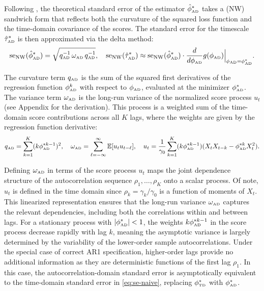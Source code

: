 \documentclass[docs/main.tex]{subfiles}
\begin{document}
Following \citet[Chapter~22.8 and Chapter~23.5]{hansen_econometrics_2022}, the theoretical standard error of the estimator $\hat{\phi}^*_{\scriptscriptstyle\text{AD}}$ takes a \citet{newey_simple_1987} (NW) sandwich form that reflects both the curvature of the squared loss function and the time-domain covariance of the scores. The standard error for the timescale $\hat{\tau}^*_{\scriptscriptstyle\text{AD}}$ is then approximated via the delta method:
\begin{align}\label{eq:stderr-autocorrelation-domain}
    \text{se}_{\text{NW}}(\hat{\phi}^*_{\scriptscriptstyle\text{AD}}) = \sqrt{q_{\scriptscriptstyle\text{AD}}^{-1}\, \omega_{\scriptscriptstyle\text{AD}} \,q_{\scriptscriptstyle\text{AD}}^{-1}}, \quad 
    \text{se}_{\text{NW}}(\hat{\tau}^*_{\scriptscriptstyle\text{AD}}) \approx \text{se}_{\text{NW}}(\hat{\phi}^*_{\scriptscriptstyle\text{AD}}) \cdot \frac{d}{d\phi_{\scriptscriptstyle\text{AD}}}g(\phi_{\scriptscriptstyle\text{AD}})\Big|_{\phi_{\scriptscriptstyle\text{AD}}=\phi_{\scriptscriptstyle\text{AD}}^*}.
\end{align}

\noindent The curvature term $q_{\scriptscriptstyle\text{AD}}$ is the sum of the squared first derivatives of the regression function $\phi_{\scriptscriptstyle\text{AD}}^k$ with respect to $\phi_{\scriptscriptstyle\text{AD}}$, evaluated at the minimizer $\phi_{\scriptscriptstyle\text{AD}}^*$. The variance term $\omega_{\scriptscriptstyle\text{AD}}$ is the long-run variance of the normalized score process $u_t$ (see Appendix for the derivation). This process is a weighted sum of the time-domain score contributions across all $K$ lags, where the weights are given by the regression function derivative:
\begin{align}\label{eq:ad-qomega}
    q_{\scriptscriptstyle\text{AD}} = \sum_{k=1}^K (k \phi_{\scriptscriptstyle\text{AD}}^{*k-1})^2, \quad \omega_{\scriptscriptstyle\text{AD}} = \sum_{\ell=-\infty}^{\infty} \mathbb{E}[u_t u_{t-\ell}], \quad 
    u_t = \frac{1}{\gamma_0} \sum_{k=1}^K (k \phi_{\scriptscriptstyle\text{AD}}^{*k-1}) (X_t X_{t-k} - \phi_{\scriptscriptstyle\text{AD}}^{*k}X_t^2).
\end{align}

Defining $\omega_{\scriptscriptstyle\text{AD}}$ in terms of the score process $u_t$ maps the joint dependence structure of the autocorrelation sequence $\rho_1, \dots, \rho_K$ onto a scalar process. Of note, $u_t$ is defined in the time domain since $\rho_k=\gamma_k/\gamma_0$ is a function of moments of $X_t$. This linearized representation ensures that the long-run variance $\omega_{\scriptscriptstyle\text{AD}}$ captures the relevant dependencies, including both the correlations within and between lags. For a stationary process with $|\phi_{\scriptscriptstyle\text{AD}}^*| < 1$, the weights $k\phi_{\scriptscriptstyle\text{AD}}^{*k-1}$ in the score process decrease rapidly with lag $k$, meaning the asymptotic variance is largely determined by the variability of the lower-order sample autocorrelations. Under the special case of correct AR1 specification, higher-order lags provide no additional information as they are deterministic functions of the first lag $\rho_1$. In this case, the autocorrelation-domain standard error is asymptotically equivalent to the time-domain standard error in \eqref{eq:se-naive}, replacing $\phi_{\scriptscriptstyle\text{TD}}^*$ with $\phi_{\scriptscriptstyle\text{AD}}^*$.
\end{document}
